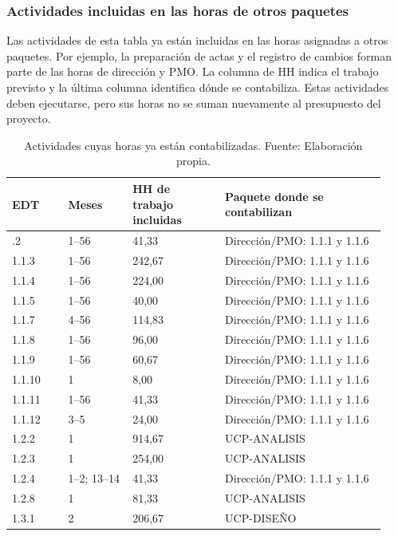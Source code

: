 \documentclass[11pt]{article}
\begin{document}
\subsubsection{Actividades incluidas en las horas de otros paquetes}

Las actividades de esta tabla ya están incluidas en las horas asignadas a otros paquetes. Por ejemplo, la preparación de actas y el registro de cambios forman parte de las horas de dirección y PMO. La columna de HH indica el trabajo previsto y la última columna identifica dónde se contabiliza. Estas actividades deben ejecutarse, pero sus horas no se suman nuevamente al presupuesto del proyecto.

\begingroup
\small
\begin{longtable}{@{}p{0.14\linewidth}p{0.16\linewidth}p{0.23\linewidth}p{0.4\linewidth}@{}}
\caption[Actividades cuyas horas ya están contabilizadas]{Actividades cuyas horas ya están contabilizadas. Fuente: Elaboración propia.}\label{tab:t15-incluidos}\\
\toprule
\textbf{EDT} & \textbf{Meses} & \textbf{HH de trabajo incluidas} & \textbf{Paquete donde se contabilizan} \\
\midrule
\endhead
\bottomrule
\endlastfoot
1.1.2 & 1--56 & 41,33 & Dirección/PMO: 1.1.1 y 1.1.6 \\
1.1.3 & 1--56 & 242,67 & Dirección/PMO: 1.1.1 y 1.1.6 \\
1.1.4 & 1--56 & 224,00 & Dirección/PMO: 1.1.1 y 1.1.6 \\
1.1.5 & 1--56 & 40,00 & Dirección/PMO: 1.1.1 y 1.1.6 \\
1.1.7 & 4--56 & 114,83 & Dirección/PMO: 1.1.1 y 1.1.6 \\
1.1.8 & 1--56 & 96,00 & Dirección/PMO: 1.1.1 y 1.1.6 \\
1.1.9 & 1--56 & 60,67 & Dirección/PMO: 1.1.1 y 1.1.6 \\
1.1.10 & 1 & 8,00 & Dirección/PMO: 1.1.1 y 1.1.6 \\
1.1.11 & 1--56 & 41,33 & Dirección/PMO: 1.1.1 y 1.1.6 \\
1.1.12 & 3--5 & 24,00 & Dirección/PMO: 1.1.1 y 1.1.6 \\
1.2.2 & 1 & 914,67 & UCP-ANALISIS \\
1.2.3 & 1 & 254,00 & UCP-ANALISIS \\
1.2.4 & 1--2; 13--14 & 41,33 & Dirección/PMO: 1.1.1 y 1.1.6 \\
1.2.8 & 1 & 81,33 & UCP-ANALISIS \\
1.3.1 & 2 & 206,67 & UCP-DISEÑO \\

\end{longtable}
\end{document}
